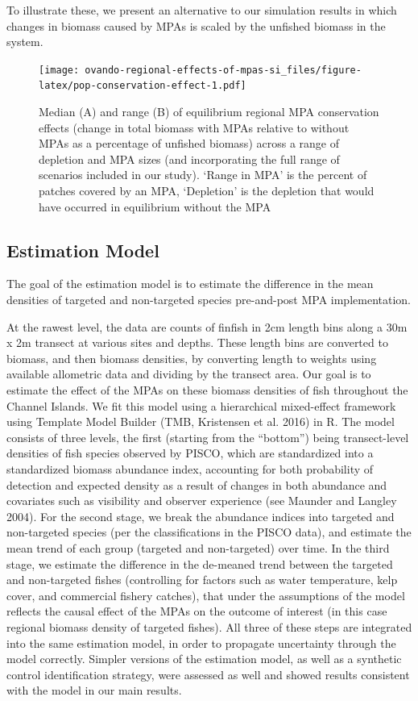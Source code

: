 \documentclass[]{article}
\begin{document}
To illustrate these, we present an alternative to our simulation results in which changes in biomass caused by MPAs is scaled by the unfished biomass in the system.

\begin{figure}
\centering
\texttt{[image: ovando-regional-effects-of-mpas-si\_files/figure-latex/pop-conservation-effect-1.pdf]}
\caption{\label{fig:pop-conservation-effect}Median (A) and range (B) of equilibrium regional MPA conservation effects (change in total biomass with MPAs relative to without MPAs as a percentage of unfished biomass) across a range of depletion and MPA sizes (and incorporating the full range of scenarios included in our study). `Range in MPA' is the percent of patches covered by an MPA, `Depletion' is the depletion that would have occurred in equilibrium without the MPA}
\end{figure}

\hypertarget{estimation-model}{%
\subsection{Estimation Model}\label{estimation-model}}

The goal of the estimation model is to estimate the difference in the mean densities of targeted and non-targeted species pre-and-post MPA implementation.

At the rawest level, the data are counts of finfish in 2cm length bins along a 30m x 2m transect at various sites and depths. These length bins are converted to biomass, and then biomass densities, by converting length to weights using available allometric data and dividing by the transect area. Our goal is to estimate the effect of the MPAs on these biomass densities of fish throughout the Channel Islands. We fit this model using a hierarchical mixed-effect framework using Template Model Builder (TMB, Kristensen et al. 2016) in R. The model consists of three levels, the first (starting from the ``bottom'') being transect-level densities of fish species observed by PISCO, which are standardized into a standardized biomass abundance index, accounting for both probability of detection and expected density as a result of changes in both abundance and covariates such as visibility and observer experience (see Maunder and Langley 2004). For the second stage, we break the abundance indices into targeted and non-targeted species (per the classifications in the PISCO data), and estimate the mean trend of each group (targeted and non-targeted) over time. In the third stage, we estimate the difference in the de-meaned trend between the targeted and non-targeted fishes (controlling for factors such as water temperature, kelp cover, and commercial fishery catches), that under the assumptions of the model reflects the causal effect of the MPAs on the outcome of interest (in this case regional biomass density of targeted fishes). All three of these steps are integrated into the same estimation model, in order to propagate uncertainty through the model correctly. Simpler versions of the estimation model, as well as a synthetic control identification strategy, were assessed as well and showed results consistent with the model in our main results.
\end{document}
